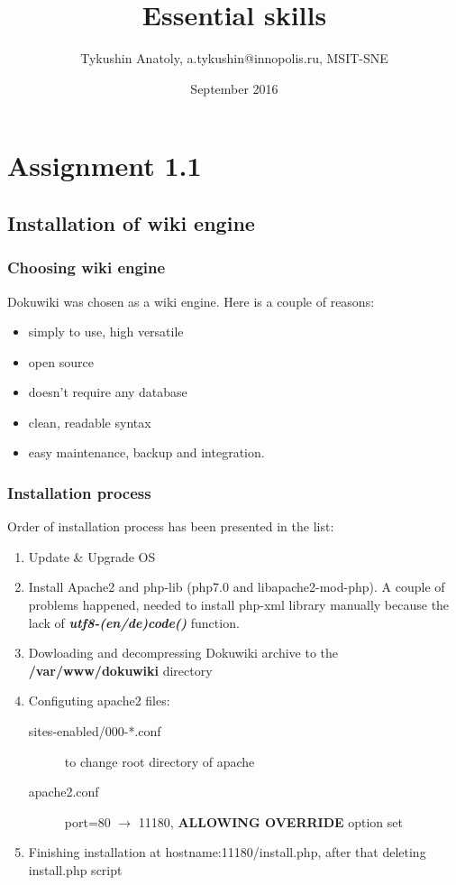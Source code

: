 \documentclass{article}
\title{Essential skills}
\author{Tykushin Anatoly, a.tykushin@innopolis.ru, MSIT-SNE }
\date{September 2016}
\begin{document}
\maketitle
\tableofcontents

\section{Assignment 1.1}
\subsection{Installation of wiki engine}
\subsubsection{Choosing wiki engine}
Dokuwiki was chosen as a wiki engine. Here is a couple of reasons:
\begin{itemize}
    \item simply to use, high versatile
    \item open source 
    \item doesn't require any database
    \item clean, readable syntax
    \item easy maintenance, backup and integration.
\end{itemize}

\subsubsection{Installation process}
Order of installation process has been presented in the list:
\begin{enumerate}
    \item Update \& Upgrade OS
    \item Install Apache2 and php-lib (php7.0 and libapache2-mod-php). A couple of problems happened, needed to install php-xml library manually because the lack of \textbf{\textit{utf8-(en/de)code()}} function.
    \item Dowloading and decompressing Dokuwiki archive to the \textbf{/var/www/dokuwiki} directory
    \item Configuting apache2 files:
    \begin{description}
        \item[sites-enabled/000-*.conf] to change root directory of apache
        \item[apache2.conf]  port=80 $ \to $ 11180, \textbf{ALLOWING OVERRIDE } option set
    \end{description}
    \item Finishing installation at hostname:11180/install.php, after that deleting install.php script
\end{enumerate}
\end{document}

